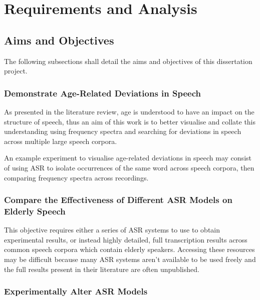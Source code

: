 \chapter{Requirements and Analysis}\label{ch:requirements-and-analysis}

\section{Aims and Objectives}\label{sec:aims-and-objectives2}

The following subsections shall detail the aims and objectives of this dissertation project.

\subsection{Demonstrate Age-Related Deviations in Speech}\label{subsec:aim1}

As presented in the literature review, age is understood to have an impact on the structure of
speech, thus an aim of this work is to better visualise and collate this understanding using
frequency spectra and searching for deviations in speech across multiple large speech corpora.

An example experiment to visualise age-related deviations in speech may consist of using ASR to
isolate occurrences of the same word across speech corpora, then comparing frequency spectra
across recordings.

\subsection{}\label{subsec:aim2}


\subsection{Compare the Effectiveness of Different ASR Models on Elderly Speech}\label{subsec:aim3}

This objective requires either a series of ASR systems to use to obtain experimental results, or
instead highly detailed, full transcription results across common speech corpora which contain
elderly speakers.
Accessing these resources may be difficult because many ASR systems aren't available to be used
freely and the full results present in their literature are often unpublished.


\subsection{Experimentally Alter ASR Models}\label{subsec:aim4}

